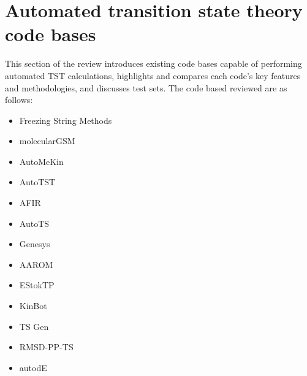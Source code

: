 \documentclass[preprint, 11pt]{elsarticle} %
\begin{document}


\section{Automated transition state theory code bases}

This section of the review introduces existing code bases capable of performing automated TST calculations, highlights and compares each code's key features and methodologies, and discusses test sets.
The code based reviewed are as follows:
\begin{itemize}
    \item Freezing String Methods \cite{Behn:2011}
    \item molecularGSM \cite{Peters:2004,Zimmerman:2013jctc,Zimmerman:2013jcp,Zimmerman:2015jcc}
    \item AutoMeKin \cite{Martinez:2015,Martinez:2015jccp,rodriguez:2018,mopac:2016}
    \item AutoTST \cite{Bhoorasingh:2015,bhoorasingh:2017}
    \item AFIR \cite{Maeda:2016, Madea:2018}
    \item AutoTS \cite{jacobson:2017}
    \item Genesys \cite{VANDEVIJVER:2018, vandewiele:2012}
    \item AAROM \cite{Guan:2018}
    \item EStokTP \cite{Cavallotti:2019jctc}
    \item KinBot \cite{kinbot:2018, kinbot:2019}
    \item TS Gen \cite{grambow:2020, pattanaik:2020}
    \item RMSD-PP-TS \cite{rasmussen:2020}
    \item autodE \cite{young:2020}
\end{itemize}

\end{document}
